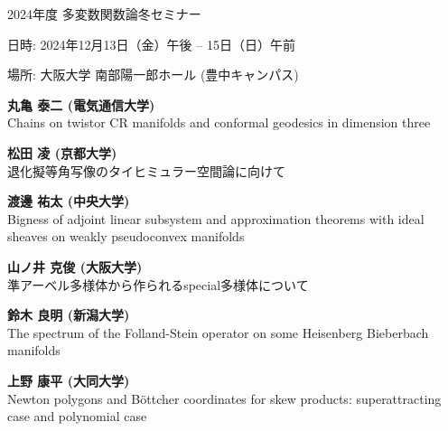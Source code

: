 \documentclass[dvipdfmx,a4paper,12pt]{article}
\theoremstyle{plain} %
\theoremstyle{definition} %
\begin{document}
\begin{center}
  {\LARGE 2024年度 多変数関数論冬セミナー}
 
  \end{center}
  
\vskip5mm
\begin{flushleft}
{\large 日時: 2024年12月13日（金）午後 -- 15日（日）午前}


{\large 場所: 大阪大学 南部陽一郎ホール (豊中キャンパス)}

\end{flushleft}




\vskip5mm
\vskip3mm

\vskip1mm
{\bf 丸亀 泰二 (電気通信大学)}\\
Chains on twistor CR manifolds and conformal geodesics in dimension three 
\vskip3mm

{\bf 松田 凌 (京都大学)}\\
退化擬等角写像のタイヒミュラー空間論に向けて
\vskip3mm

{\bf 渡邊 祐太 (中央大学)}\\
Bigness of adjoint linear subsystem and approximation theorems with ideal sheaves on weakly pseudoconvex manifolds


\vskip5mm


\vskip1mm
{\bf 山ノ井 克俊 (大阪大学)}\\
準アーベル多様体から作られるspecial多様体について
\vskip3mm

{\bf 鈴木 良明 (新潟大学) }\\
The spectrum of the Folland-Stein operator on some Heisenberg Bieberbach manifolds
\vskip3mm

{\bf 上野 康平 (大同大学)}\\
Newton polygons and B\"{o}ttcher coordinates for skew products: 
superattracting case and polynomial case
\vskip3mm
\end{document}
